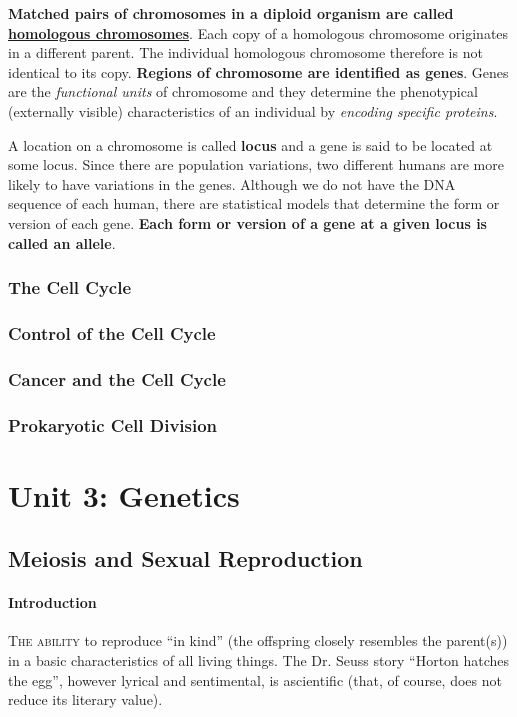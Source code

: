 \documentclass[12pt]{article}
\begin{document}
\textbf{Matched pairs of chromosomes in a diploid organism are called \underline{homologous chromosomes}}. Each copy of a homologous chromosome originates in a different parent. The individual homologous chromosome therefore is not identical to its copy. \textbf{Regions of chromosome are identified as genes}. Genes are the \emph{functional units} of chromosome and they determine the phenotypical (externally visible) characteristics of an individual by \emph{encoding specific proteins}. 

A location on a chromosome is called \textbf{locus} and a gene is said to be located at some locus. Since there are population variations, two different humans are more likely to have variations in the genes. Although we do not have the DNA sequence of each human, there are statistical models that determine the form or version of each gene. \textbf{Each form or version of a gene at a given locus is called an allele}.
\subsubsection{The Cell Cycle}
\subsubsection{Control of the Cell Cycle}
\subsubsection{Cancer and the Cell Cycle}
\subsubsection{Prokaryotic Cell Division}

\section{Unit 3: Genetics}
\subsection{Meiosis and Sexual Reproduction}
\paragraph{Introduction}
\lettrine[lines=3]{T}{he ability} to reproduce ``in kind'' (the offspring closely resembles the parent(s)) in a basic characteristics of all living things. The Dr. Seuss story ``Horton hatches the egg'', however lyrical and sentimental, is ascientific (that, of course, does not reduce its literary value).
\end{document}
